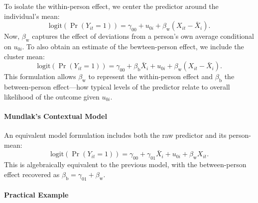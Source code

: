 To isolate the within-person effect, we center the predictor around the individual’s mean:
\begin{equation}
    \label{eqn:M2-logit}
\text{logit}(\Pr(Y_{it} = 1)) = \gamma_{00} + u_{0i} + \beta_\text{w} (X_{it} - \bar{X}_i).
\end{equation}
Now, \( \beta_\text{w} \) captures the effect of deviations from a person’s own average conditional on $u_{0i}$. To also obtain an estimate of the bewteen-person effect, we include the cluster mean:
\begin{equation}
    \label{eqn:M4-logit}
\text{logit}(\Pr(Y_{it} = 1)) = \gamma_{00} + \beta_\text{b} \bar{X}_i + u_{0i} + \beta_\text{w} (X_{it} - \bar{X}_i).
\end{equation}
This formulation allows \( \beta_\text{w} \) to represent the within-person effect and \( \beta_\text{b} \) the between-person effect—how typical levels of the predictor relate to overall likelihood of the outcome given $u_{0i}$.

\paragraph{Mundlak's Contextual Model}

An equivalent model formulation includes both the raw predictor and its person-mean:
\begin{equation}
    \label{eqn:M3-logit}
\text{logit}(\Pr(Y_{it} = 1)) = \gamma_{00} + \gamma_{01} \bar{X}_i + u_{0i} + \beta_\text{w} X_{it}.
\end{equation}
This is algebraically equivalent to the previous model, with the between-person effect recovered as \( \beta_\text{b} = \gamma_{01} + \beta_\text{w} \). 

\paragraph{Practical Example}

